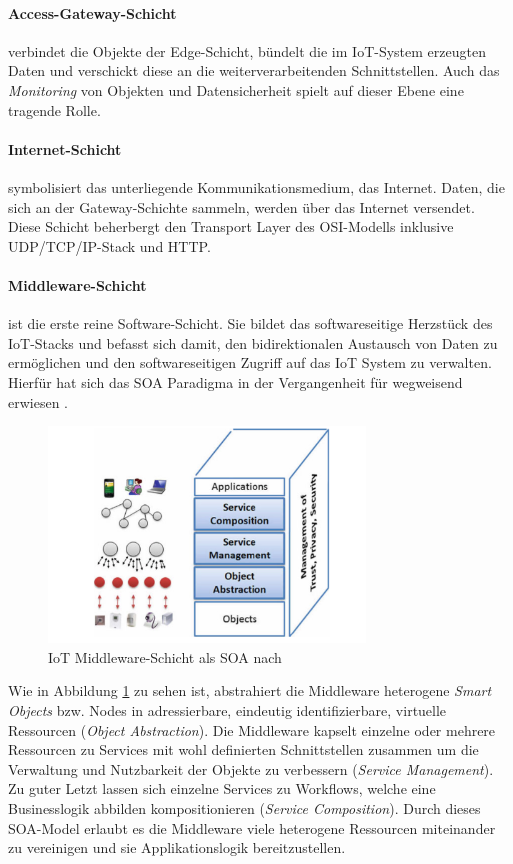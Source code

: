 \paragraph{Access-Gateway-Schicht} verbindet die Objekte der Edge-Schicht, bündelt die im \ac{IoT}-System erzeugten Daten und verschickt diese an die weiterverarbeitenden Schnittstellen. Auch das \textit{Monitoring} von Objekten und Datensicherheit spielt auf dieser Ebene eine tragende Rolle. 

\paragraph{Internet-Schicht} symbolisiert das unterliegende Kommunikationsmedium, das Internet. Daten, die sich an der  Gateway-Schichte sammeln, werden über das Internet versendet. Diese Schicht beherbergt den Transport Layer des OSI-Modells inklusive UDP/TCP/IP-Stack und HTTP.

\paragraph{Middleware-Schicht} ist die erste reine Software-Schicht. Sie bildet das softwareseitige Herzstück des \ac{IoT}-Stacks und befasst sich damit, den bidirektionalen Austausch von Daten zu ermöglichen und den softwareseitigen Zugriff auf das \ac{IoT} System zu verwalten. Hierfür hat sich das \ac{SOA} Paradigma in der Vergangenheit für wegweisend erwiesen \cite{laliwala2008event}.
\begin{figure}[h]
    \centering
    \includegraphics[width=0.75\textwidth]{bilder/chapter2/iotsoa.png}
    \caption{IoT Middleware-Schicht als \ac{SOA} nach \cite{bandyopadhyay2011internet}}
    \label{fig:iotsoa}
\end{figure}
Wie in Abbildung \ref{fig:iotsoa} zu sehen ist, abstrahiert die Middleware heterogene \textit{Smart Objects} bzw. Nodes in adressierbare, eindeutig identifizierbare, virtuelle Ressourcen (\textit{Object Abstraction}). Die Middleware kapselt einzelne oder mehrere Ressourcen zu Services mit wohl definierten Schnittstellen zusammen um die Verwaltung und Nutzbarkeit der Objekte zu verbessern (\textit{Service Management}). Zu guter Letzt lassen sich einzelne Services zu Workflows, welche eine Businesslogik abbilden kompositionieren (\textit{Service Composition}). Durch dieses \ac{SOA}-Model erlaubt es die Middleware viele heterogene Ressourcen miteinander zu vereinigen und sie Applikationslogik bereitzustellen. 

